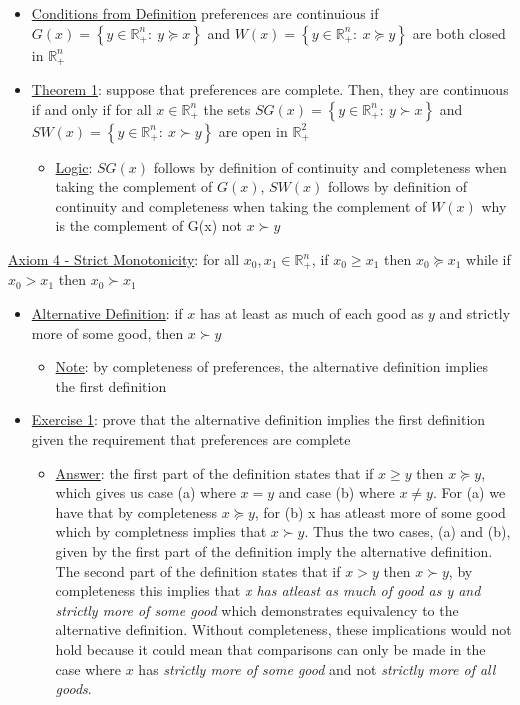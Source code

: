 \documentclass{article}
\begin{document}
  \begin{itemize}
    \item  \underline{Conditions from Definition} preferences are continuious if $G(x) = \left\{ y \in \mathbb{R}_{+}^{n}: \ y \succeq x \right\}$ and $W(x) = \left\{ y \in \mathbb{R}_{+}^{n}: \ x \succeq y \right\}$ are both closed in $\mathbb{R}_{+}^{n}$
    \item  \underline{Theorem 1}: suppose that preferences are complete. Then, they are continuous if and only if for all $x \in \mathbb{R}_{+}^{n}$ the sets $SG(x) = \left\{ y \in \mathbb{R}_{+}^{n}: \ y \succ x \right\}$ and $SW(x) = \left\{ y \in \mathbb{R}_{+}^{n}: \ x \succ y \right\}$ are open in $\mathbb{R}_{+}^{2}$
    \begin{itemize}
      \item  \underline{Logic}: $SG(x)$ follows by definition of continuity and completeness when taking the complement of $G(x)$, $SW(x)$ follows by definition of continuity and completeness when taking the complement of $W(x)$ \begingroup\color{magenta} why is the complement of G(x) not $x \succ y$ \endgroup
    \end{itemize}
  \end{itemize}
  \par
  \underline{Axiom 4 - Strict Monotonicity}: for all $x_{0}, x_{1} \in \mathbb{R}_{+}^{n}$, if $x_{0} \geq x_{1}$ then $x_{0} \succeq x_{1}$ while if $x_{0} > x_{1}$ then $x_{0} \succ x_{1}$
  \begin{itemize}
    \item  \underline{Alternative Definition}: if $x$ has at least as much of each good as $y$ and strictly more of some good, then $x \succ y$
    \begin{itemize}
      \item  \underline{Note}: by completeness of preferences, the alternative definition implies the first definition
    \end{itemize}
    \item  \underline{Exercise 1}: prove that the alternative definition implies the first definition given the requirement that preferences are complete
    \begin{itemize}
      \item  \underline{Answer}: the first part of the definition states that if $x \geq y$ then $x \succeq y$, which gives us case (a) where $x = y$ and case (b) where $x \neq y$. For (a) we have that by completeness $x \succeq y$, for (b) x has atleast more of some good which by completness implies that $x \succ y$. Thus the two cases, (a) and (b), given by the first part of the definition imply the alternative definition. The second part of the definition states that if $x > y$ then $x \succ y$, by completeness this implies that \textit{x has atleast as much of good as y and strictly more of some good} which demonstrates equivalency to the alternative definition. Without completeness, these implications would not hold because it could mean that comparisons can only be made in the case where $x$ has \textit{strictly more of some good} and not \textit{strictly more of all goods}.
    \end{itemize}
  \end{itemize}
\end{document}
